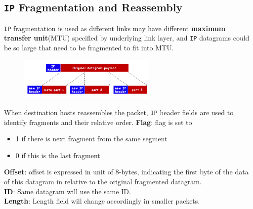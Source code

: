 \documentclass[12pt]{article}
\newcommand\IP{\texttt{IP} }
\theoremstyle{definition}
\begin{document}
\subsection{\IP Fragmentation and Reassembly}
\IP fragmentation is used as different links may have different \textbf{maximum transfer unit}(MTU) specified by underlying link layer, and \IP datagrams could be so large that need to be fragmented to fit into MTU.
\begin{figure}[h]
\centering
\includegraphics[width = 0.6\textwidth]{6_2_1.png}
\end{figure}
When destination hosts reassembles the packet, \IP header fields are used to identify fragments and their relative order.
\textbf{Flag}: flag is set to 
\begin{itemize}
  \item 1 if there is next fragment from the same segment
  \item 0 if this is the last fragment
\end{itemize}
\textbf{Offset}: offset is expressed in unit of 8-bytes, indicating the first byte of the data of this datagram in relative to the original fragmented datagram.\\
\textbf{ID}: Same datagram will use the same ID.\\
\textbf{Length}: Length field will change accordingly in smaller packets.
\end{document}
